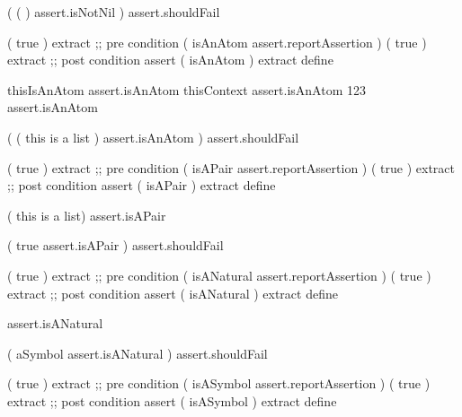 \startJoylolTest
(
  ( )
  assert.isNotNil
) assert.shouldFail
\stopJoylolTest
\stopTestCase
\stopTestSuite


\startJoylolCode
( { true } ) extract ;; pre condition
(
  isAnAtom
  assert.reportAssertion
)
( { true } ) extract ;; post condition
assert
( isAnAtom ) extract
define
\stopJoylolCode

\startJoylolTest
thisIsAnAtom
assert.isAnAtom
thisContext
assert.isAnAtom
123
assert.isAnAtom
\stopJoylolTest
\stopTestCase

\startJoylolTest
(
  ( this is a list )
  assert.isAnAtom
) assert.shouldFail
\stopJoylolTest
\stopTestCase
\stopTestSuite


\startJoylolCode
( { true } ) extract ;; pre condition
(
  isAPair
  assert.reportAssertion
)
( { true } ) extract ;; post condition
assert
( isAPair ) extract
define
\stopJoylolCode

\startJoylolTest
( this is a list)
assert.isAPair
\stopJoylolTest
\stopTestCase

\startJoylolTest
(
  true
  assert.isAPair
) assert.shouldFail
\stopJoylolTest
\stopTestCase
\stopTestSuite


\startJoylolCode
( { true } ) extract ;; pre condition
(
  isANatural
  assert.reportAssertion
)
( { true } ) extract ;; post condition
assert
( isANatural ) extract
define
\stopJoylolCode

assert.isANatural
\stopJoylolTest
\stopTestCase

\startJoylolTest
(
  aSymbol
  assert.isANatural
) assert.shouldFail
\stopJoylolTest
\stopTestCase
\stopTestSuite


\startJoylolCode
( { true } ) extract ;; pre condition
(
  isASymbol
  assert.reportAssertion
)
( { true } ) extract ;; post condition
assert
( isASymbol ) extract
define
\stopJoylolCode

